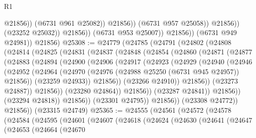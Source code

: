 \begin{lexlean}{R1}
\begin{coremodule}
                                    @21856))
                                (@6731 @961 @25082))
                              @21856))
                          (@6731 @957 @25058))
                        @21856))
                    (@23252 @25032))
                  @21856))
              (@6731 @953 @25007))
            @21856))
        (@6731 @949 @24981))
      @21856)
@25308 := @24779
    (@24785
      (@24791
        (@24802
          (@24808
            (@24814
              (@24825
                (@24831
                  (@24837
                    (@24848
                      (@24854
                        (@24860
                          (@24871
                            (@24877
                              (@24883
                                (@24894
                                  (@24900
                                    (@24906
                                      (@24917
                                        (@24923
                                          (@24929
                                            (@24940
                                              (@24946
                                                (@24952
                                                  (@24964
                                                    (@24970
                                                      (@24976
                                                        (@24988 @25250 (@6731 @945 @24957))
                                                        @21856))
                                                    (@23259 @24933))
                                                  @21856))
                                              (@23266 @24910))
                                            @21856))
                                        (@23273 @24887))
                                      @21856))
                                  (@23280 @24864))
                                @21856))
                            (@23287 @24841))
                          @21856))
                      (@23294 @24818))
                    @21856))
                (@23301 @24795))
              @21856))
          (@23308 @24772))
        @21856))
    (@23315 @24749)
@25365 := @24555
    (@24561
      (@24572
        (@24578
          (@24584
            (@24595
              (@24601
                (@24607
                  (@24618
                    (@24624
                      (@24630
                        (@24641
                          (@24647
                            (@24653
                              (@24664
                                (@24670

\end{coremodule}
\end{lexlean}
